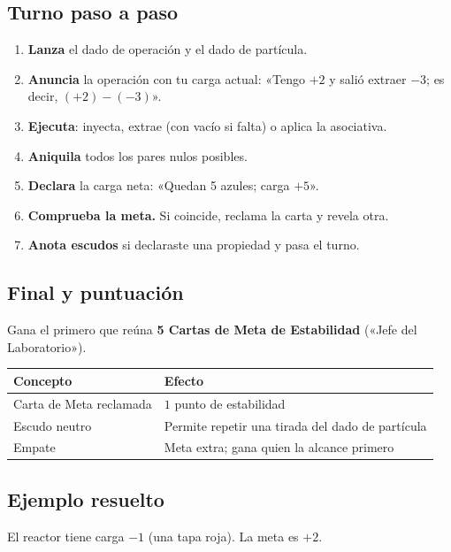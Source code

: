 \documentclass[12pt, letterpaper]{article}
\begin{document}
\subsection{Turno paso a paso}

\begin{enumerate}[leftmargin=*]
  \item \textbf{Lanza} el dado de operación y el dado de partícula.
  \item \textbf{Anuncia} la operación con tu carga actual: «Tengo $+2$ y salió extraer $-3$; es decir, $(+2)-(-3)$».
  \item \textbf{Ejecuta}: inyecta, extrae (con vacío si falta) o aplica la asociativa.
  \item \textbf{Aniquila} todos los pares nulos posibles.
  \item \textbf{Declara} la carga neta: «Quedan 5 azules; carga $+5$».
  \item \textbf{Comprueba la meta.} Si coincide, reclama la carta y revela otra.
  \item \textbf{Anota escudos} si declaraste una propiedad y pasa el turno.
\end{enumerate}

\subsection{Final y puntuación}

Gana el primero que reúna \textbf{5 Cartas de Meta de Estabilidad} («Jefe del Laboratorio»).

\begin{center}
\small
\begin{tabular}{@{}l l@{}}
\toprule
\textbf{Concepto} & \textbf{Efecto}\\
\midrule
Carta de Meta reclamada & $1$ punto de estabilidad\\
Escudo neutro & Permite repetir una tirada del dado de partícula\\
Empate & Meta extra; gana quien la alcance primero\\
\bottomrule
\end{tabular}
\end{center}

\subsection{Ejemplo resuelto}

El reactor tiene carga $-1$ (una tapa roja). La meta es $+2$.
\end{document}
